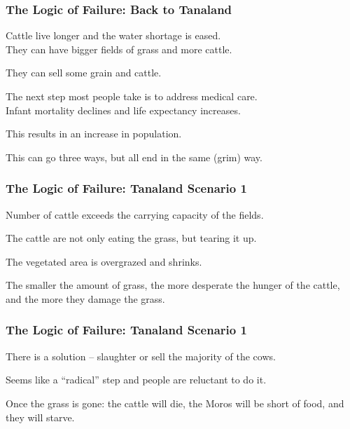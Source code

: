 \begin{frame}
\frametitle{The Logic of Failure: Back to Tanaland}
\begin{changemargin}{1cm}

Cattle live longer and the water shortage is eased.\\
\quad They can have bigger fields of grass and more cattle. 

They can sell some grain and cattle.

The next step most people take is to address medical care.\\
\quad Infant mortality declines and life expectancy increases. 

This results in an increase in population. 

This can go three ways, but all end in the same (grim) way.


\end{changemargin}
\end{frame}

\begin{frame}
\frametitle{The Logic of Failure: Tanaland Scenario 1}
\begin{changemargin}{1cm}

Number of cattle exceeds the carrying capacity of the fields. 

The cattle are not only eating the grass, but tearing it up. 

The vegetated area is overgrazed and shrinks. 

The smaller the amount of grass, the more desperate the hunger of the cattle, and the more they damage the grass. 


\end{changemargin}
\end{frame}

\begin{frame}
\frametitle{The Logic of Failure: Tanaland Scenario 1}
\begin{changemargin}{1cm}

There is a solution  -- slaughter or sell the majority of the cows.
 
Seems like a ``radical'' step and people are reluctant to do it. 
 
Once the grass is gone: the cattle will die, the Moros will be short of food, and they will starve.

\end{changemargin}
\end{frame}


